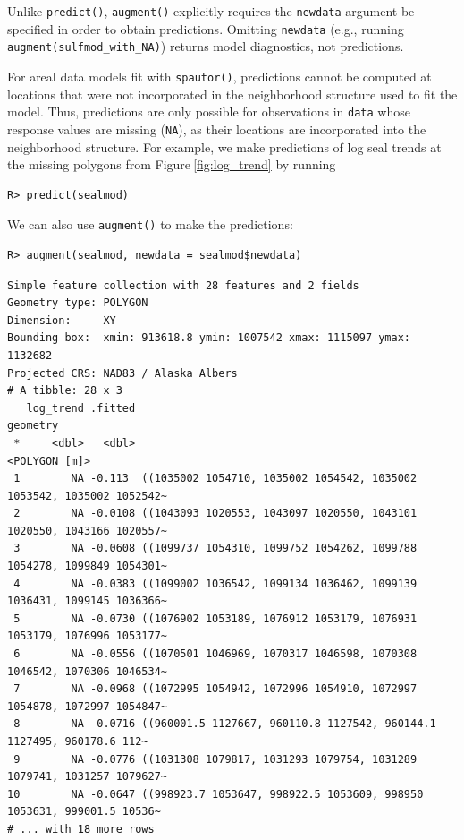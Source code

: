 \documentclass[10pt,letterpaper]{article}
\begin{document}
Unlike \texttt{predict()}, \texttt{augment()} explicitly requires the
\texttt{newdata} argument be specified in order to obtain predictions.
Omitting \texttt{newdata} (e.g., running
\texttt{augment(sulfmod\_with\_NA)}) returns model diagnostics, not
predictions.

For areal data models fit with \texttt{spautor()}, predictions cannot be
computed at locations that were not incorporated in the neighborhood
structure used to fit the model. Thus, predictions are only possible for
observations in \texttt{data} whose response values are missing
(\texttt{NA}), as their locations are incorporated into the neighborhood
structure. For example, we make predictions of log seal trends at the
missing polygons from Figure\(~\)\ref{fig:log_trend} by running

\begin{verbatim}
R> predict(sealmod)
\end{verbatim}

We can also use \texttt{augment()} to make the predictions:

\begin{verbatim}
R> augment(sealmod, newdata = sealmod$newdata)
\end{verbatim}

\begin{verbatim}
Simple feature collection with 28 features and 2 fields
Geometry type: POLYGON
Dimension:     XY
Bounding box:  xmin: 913618.8 ymin: 1007542 xmax: 1115097 ymax: 1132682
Projected CRS: NAD83 / Alaska Albers
# A tibble: 28 x 3
   log_trend .fitted                                                              geometry
 *     <dbl>   <dbl>                                                         <POLYGON [m]>
 1        NA -0.113  ((1035002 1054710, 1035002 1054542, 1035002 1053542, 1035002 1052542~
 2        NA -0.0108 ((1043093 1020553, 1043097 1020550, 1043101 1020550, 1043166 1020557~
 3        NA -0.0608 ((1099737 1054310, 1099752 1054262, 1099788 1054278, 1099849 1054301~
 4        NA -0.0383 ((1099002 1036542, 1099134 1036462, 1099139 1036431, 1099145 1036366~
 5        NA -0.0730 ((1076902 1053189, 1076912 1053179, 1076931 1053179, 1076996 1053177~
 6        NA -0.0556 ((1070501 1046969, 1070317 1046598, 1070308 1046542, 1070306 1046534~
 7        NA -0.0968 ((1072995 1054942, 1072996 1054910, 1072997 1054878, 1072997 1054847~
 8        NA -0.0716 ((960001.5 1127667, 960110.8 1127542, 960144.1 1127495, 960178.6 112~
 9        NA -0.0776 ((1031308 1079817, 1031293 1079754, 1031289 1079741, 1031257 1079627~
10        NA -0.0647 ((998923.7 1053647, 998922.5 1053609, 998950 1053631, 999001.5 10536~
# ... with 18 more rows
\end{verbatim}
\end{document}
